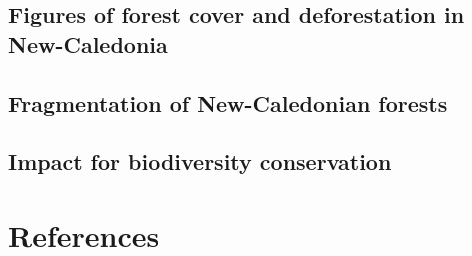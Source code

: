 \documentclass[paper=a4, fontsize=12pt, DIV=13, english, dvipsnames]{scrartcl}
\begin{document}
\subsection{Figures of forest cover and deforestation in New-Caledonia}
\label{sec:org1f5159b}

\subsection{Fragmentation of New-Caledonian forests}
\label{sec:org54add5a}

\subsection{Impact for biodiversity conservation}
\label{sec:org6aba26d}

\newpage
\section{References}
\label{sec:org4ee791d}
\end{document}
